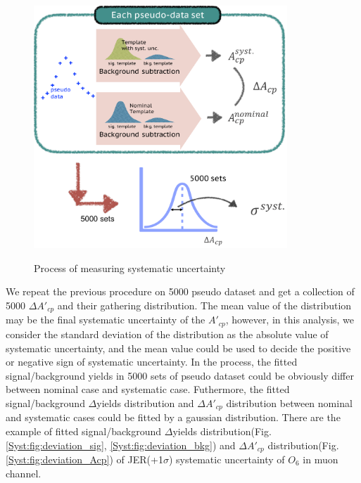 		\begin{figure}[H]
		\centering{}
	    	\includegraphics[width=0.85\textwidth]{Figures/SystUnc/approach_syst.pdf}\\
		\caption{Process of measuring systematic uncertainty}
		\label{Syst:fig:approach}
		\end{figure}
		\FloatBarrier

		We repeat the previous procedure on 5000 pseudo dataset and get a collection of 5000 $\Delta A'_{cp}$ and their gathering distribution. The mean value of the distribution may be the final systematic uncertainty of the $A'_{cp}$, however, in this analysis, we consider the standard deviation of the distribution as the absolute value of systematic uncertainty, and the mean value could be used to decide the positive or negative sign of systematic uncertainty. In the process, the fitted signal/background yields in 5000 sets of pseudo dataset could be obviously differ between nominal case and systematic case. Futhermore, the fitted signal/background $\Delta$yields distribution and $\Delta A'_{cp}$ distribution between nominal and systematic cases could be fitted by a gaussian distribution. There are the example of fitted signal/background $\Delta$yields distribution(Fig.\ref{Syst:fig:deviation_sig}, \ref{Syst:fig:deviation_bkg}) and $\Delta A'_{cp}$ distribution(Fig.\ref{Syst:fig:deviation_Acp}) of JER(+1$\sigma$) systematic uncertainty of $O_6$ in muon channel.


